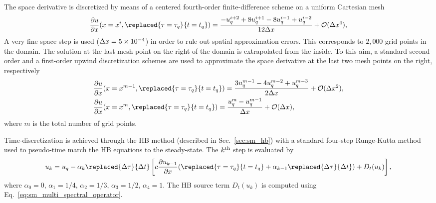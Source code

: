 The space derivative is discretized by means of a centered 
fourth-order finite-difference scheme on a uniform Cartesian mesh
\begin{equation}
    \frac{\partial u}{\partial x} (x = x^i, \replaced{\tau=\tau_q}{t=t_q}) =
    \frac{-u^{i+2}_{q} + 8 u^{i+1}_{q} - 8 u^{i-1}_{q} + u^{i-2}_{q}}{12\Delta x}
    + \mathcal{O} (\Delta x^4),
    \label{eq:convection_center4}
\end{equation}
A very fine space step is used ($\Delta x=5\e{-4}$) in order to rule 
out spatial approximation errors. This corresponds to $2,000$ grid points
in the domain. 
The solution at the last mesh 
point on the right of the domain is extrapolated 
from the inside. To this aim, a standard second-order 
and a first-order upwind discretization schemes
are used to approximate the space derivative at 
the last two mesh points on the right, respectively
\begin{equation}
    \begin{split}
        &\frac{\partial u}{\partial x} (x = x^{m-1}, \replaced{\tau=\tau_q}{t=t_q}) =
            \frac{3 u^{m-1}_{q} - 4 u^{m-2}_{q} + u^{m-3}_{q}}{2\Delta x} + \mathcal{O} (\Delta x^2), \\
        &\frac{\partial u}{\partial x} (x = x^m, \replaced{\tau=\tau_q}{t=t_q}) = 
            \frac{u^{m}_{q} - u^{m-1}_{q}}{\Delta x} + \mathcal{O} (\Delta x),
    \end{split}
\label{eq:upwind_scheme}
\end{equation}
where $m$ is the total number of grid points.

Time-discretization is achieved 
through the HB method (described in Sec.~\ref{sec:sm_hb})
with a standard four-step Runge-Kutta method~\cite{Jameson1981}
used to pseudo-time 
march the HB equations to the steady-state.
The $k\textsuperscript{th}$ step is evaluated by
\begin{equation}
    u_k = u_q - \alpha_k \replaced{\Delta \tau}{\Delta t} \left [ 
          c \frac{\partial u_{k-1}}{\partial x} 
          (\replaced{\tau=\tau_q}{t=t_q} + \alpha_{k-1} \replaced{\Delta \tau}{\Delta t})
          + D_t(u_k)
          \right],
    \label{eq:convection_rk4}
\end{equation}
where $\alpha_0 = 0$, $\alpha_1 = 1/4$, 
$\alpha_2 = 1/3$, $\alpha_3 = 1/2$, $\alpha_4 = 1$. 
The HB source term $D_t(u_k)$ is computed 
using Eq.~\eqref{eq:sm_multi_spectral_operator}.

